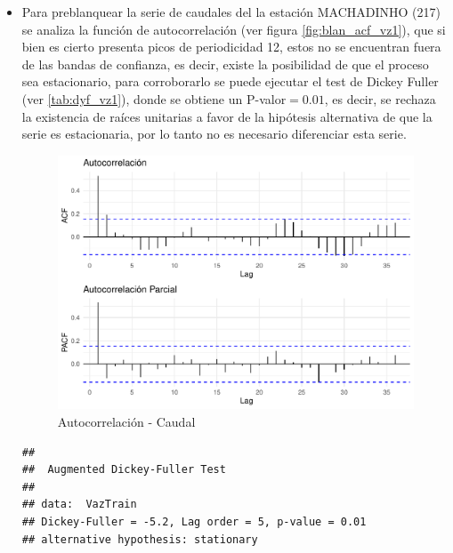 \documentclass[12pt,oneside]{book}\usepackage[]{graphicx}\usepackage[]{color}
\makeatletter
\def\maxwidth{ %
  \ifdim\Gin@nat@width>\linewidth
    \linewidth
  \else
    \Gin@nat@width
  \fi
}
\newenvironment{kframe}{%
 \def\at@end@of@kframe{}%
 \ifinner\ifhmode%
  \def\at@end@of@kframe{\end{minipage}}%
  \begin{minipage}{\columnwidth}%
 \fi\fi%
 \def\FrameCommand##1{\hskip\@totalleftmargin \hskip-\fboxsep
 \colorbox{shadecolor}{##1}\hskip-\fboxsep
     \hskip-\linewidth \hskip-\@totalleftmargin \hskip\columnwidth}%
 \MakeFramed {\advance\hsize-\width
   \@totalleftmargin\z@ \linewidth\hsize
   \@setminipage}}%
 {\par\unskip\endMakeFramed%
 \at@end@of@kframe}
\newenvironment{knitrout}{}{} %
\theoremstyle{definition} %
\makeatother
\begin{document}
\begin{itemize}
\item Para preblanquear la serie de caudales del la estación MACHADINHO (217) se analiza la función de autocorrelación  (ver figura \ref{fig:blan_acf_vz1}), que si bien es cierto presenta picos de periodicidad 12, estos no se encuentran fuera de las bandas de confianza, es decir, existe la posibilidad de que el proceso sea estacionario, para corroborarlo se puede ejecutar el test de Dickey Fuller (ver \ref{tab:dyf_vz1}), donde se obtiene un P-valor$=0.01$, es decir, se rechaza la existencia de raíces unitarias a favor de la hipótesis alternativa de que la serie es estacionaria, por lo tanto no es necesario diferenciar esta serie.




\begin{knitrout}
\color{fgcolor}\begin{figure}[H]

{\centering \includegraphics[width=\maxwidth]{figure/unnamed-chunk-24-1} 

}

\caption{\label{fig:blan_acf_vz1} Autocorrelación - Caudal}\label{fig:unnamed-chunk-24}
\end{figure}


\end{knitrout}


\begin{knitrout}
\color{fgcolor}\begin{kframe}
\begin{verbatim}
## 
## 	Augmented Dickey-Fuller Test
## 
## data:  VazTrain
## Dickey-Fuller = -5.2, Lag order = 5, p-value = 0.01
## alternative hypothesis: stationary
\end{verbatim}
\end{kframe}
\end{knitrout}
\label{tab:dyf_vz1}





\end{itemize}
\end{document}
